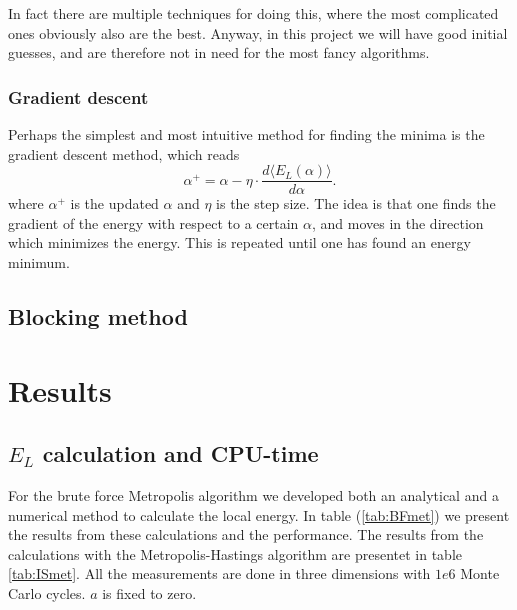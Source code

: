 \documentclass[norsk,a4paper,12pt]{article}
\begin{document}
In fact there are multiple techniques for doing this, where the most complicated ones obviously also are the best. Anyway, in this project we will have good initial guesses, and are therefore not in need for the most fancy algorithms. 

\subsubsection{Gradient descent}
Perhaps the simplest and most intuitive method for finding the minima is the gradient descent method, which reads
\begin{equation}
\alpha^+=\alpha - \eta\cdot\frac{d\langle E_L(\alpha)\rangle}{d\alpha}.
\end{equation}
where $\alpha^+$ is the updated $\alpha$ and $\eta$ is the step size. The idea is that one finds the gradient of the energy with respect to a certain $\alpha$, and moves in the direction which minimizes the energy. This is repeated until one has found an energy minimum. 


\subsection{Blocking method}
\label{Blocking}

\section{Results}

\subsection{$E_L$ calculation and CPU-time}\label{CPU}
For the brute force Metropolis algorithm we developed both an analytical and a numerical method to calculate the local energy. In table (\ref{tab:BFmet}) we present the results from these calculations and the performance. The results from the calculations with the Metropolis-Hastings algorithm are presentet in table \ref{tab:ISmet}. All the measurements are done in three dimensions with $1e6$ Monte Carlo cycles. $a$ is fixed to zero.
\end{document}
